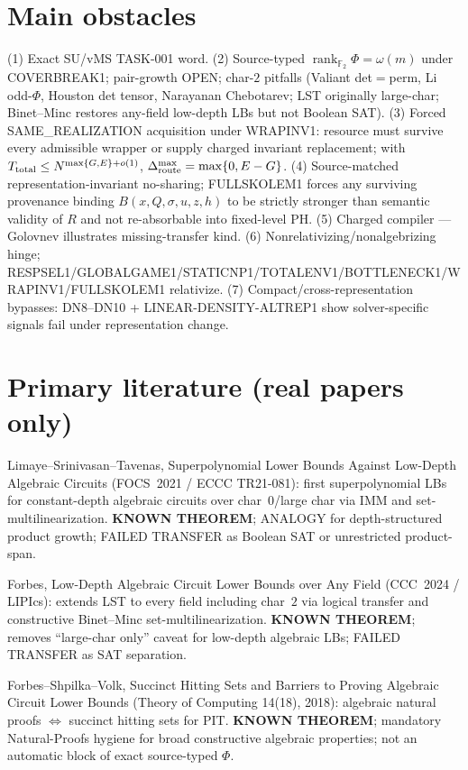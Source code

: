 \documentclass[11pt]{article}
\begin{document}
\section*{Main obstacles}
(1) Exact SU/vMS TASK-001 word. (2) Source-typed
$\operatorname{rank}_{\mathbb F_2}\Phi=\omega(m)$ under COVERBREAK1; pair-growth OPEN;
char-$2$ pitfalls (Valiant det$=$perm, Li odd-$\Phi$, Houston det tensor, Narayanan Chebotarev;
LST originally large-char; Binet--Minc restores any-field low-depth LBs but not Boolean SAT).
(3) Forced SAME\_REALIZATION acquisition under WRAPINV1: resource must survive every
admissible wrapper or supply charged invariant replacement; with
$T_{\rm total}\le N^{\max\{G,E\}+o(1)}$, $\Delta_{\rm route}^{\max}=\max\{0,E-G\}$.
(4) Source-matched representation-invariant no-sharing; FULLSKOLEM1 forces any surviving
provenance binding $B(x,Q,\sigma,u,z,h)$ to be strictly stronger than semantic validity of $R$
and not re-absorbable into fixed-level PH. (5) Charged compiler --- Golovnev illustrates
missing-transfer kind. (6) Nonrelativizing/nonalgebrizing hinge;
RESPSEL1/GLOBALGAME1/STATICNP1/TOTALENV1/BOTTLENECK1/WRAPINV1/FULLSKOLEM1 relativize.
(7) Compact/cross-representation bypasses: DN8--DN10 + LINEAR-DENSITY-ALTREP1 show
solver-specific signals fail under representation change.

\section*{Primary literature (real papers only)}
Limaye--Srinivasan--Tavenas, Superpolynomial Lower Bounds Against Low-Depth Algebraic Circuits
(FOCS~2021 / ECCC TR21-081): first superpolynomial LBs for constant-depth algebraic circuits
over char~$0$/large char via IMM and set-multilinearization. \textbf{KNOWN THEOREM}; ANALOGY
for depth-structured product growth; FAILED TRANSFER as Boolean SAT or unrestricted product-span.

Forbes, Low-Depth Algebraic Circuit Lower Bounds over Any Field (CCC~2024 / LIPIcs):
extends LST to every field including char~$2$ via logical transfer and constructive
Binet--Minc set-multilinearization. \textbf{KNOWN THEOREM}; removes ``large-char only''
caveat for low-depth algebraic LBs; FAILED TRANSFER as SAT separation.

Forbes--Shpilka--Volk, Succinct Hitting Sets and Barriers to Proving Algebraic Circuit Lower
Bounds (Theory of Computing 14(18), 2018): algebraic natural proofs $\Leftrightarrow$ succinct
hitting sets for PIT. \textbf{KNOWN THEOREM}; mandatory Natural-Proofs hygiene for broad
constructive algebraic properties; not an automatic block of exact source-typed $\Phi$.
\end{document}
